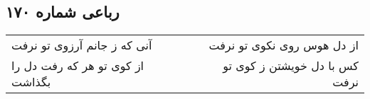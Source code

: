 \begin{center}
\section*{رباعی شماره ۱۷۰}
\label{sec:sh170}
\begin{longtable}{l p{0.5cm} r}
آنی که ز جانم آرزوی تو نرفت
&&
از دل هوس روی نکوی تو نرفت
\\
از کوی تو هر که رفت دل را بگذاشت
&&
کس با دل خویشتن ز کوی تو نرفت
\\
\end{longtable}
\end{center}
